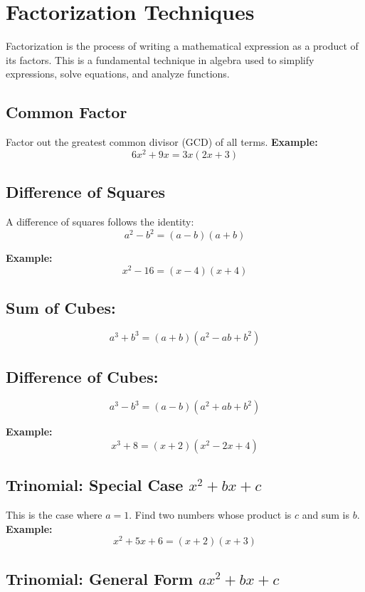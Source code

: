 \newpage
\section{Factorization Techniques}

Factorization is the process of writing a mathematical expression as a product 
of its factors. This is a fundamental technique in algebra used to simplify expressions, 
solve equations, and analyze functions.

\subsection{Common Factor}

Factor out the greatest common divisor (GCD) of all terms.\newline
\textbf{Example:}
\[
6x^2 + 9x = 3x(2x + 3)
\]

\subsection{Difference of Squares}

A difference of squares follows the identity:
\[
a^2 - b^2 = (a - b)(a + b)
\]

\textbf{Example:}
\[
x^2 - 16 = (x - 4)(x + 4)
\]


\subsection{Sum of Cubes:}
\[
a^3 + b^3 = (a + b)(a^2 - ab + b^2)
\]

\subsection{Difference of Cubes:}
\[
a^3 - b^3 = (a - b)(a^2 + ab + b^2)
\]

\textbf{Example:}
\[
x^3 + 8 = (x + 2)(x^2 - 2x + 4)
\]


\subsection{Trinomial: Special Case \texorpdfstring{\(x^2 + bx + c\)}{x² + bx + c}}

This is the case where \(a = 1\). Find two numbers whose product is \(c\) and sum is \(b\).\newline
\textbf{Example:}
\[
x^2 + 5x + 6 = (x + 2)(x + 3)
\]


\subsection{Trinomial: General Form \texorpdfstring{\(ax^2 + bx + c\)}{ax² + bx + c}}

